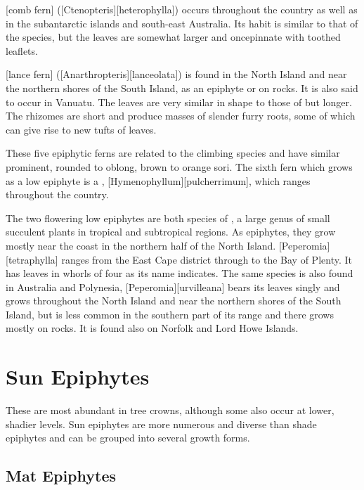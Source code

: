 [comb fern] ([Ctenopteris][heterophylla]) occurs throughout the country as well as in the subantarctic islands and south-east Australia.
Its habit is similar to that of the  species, but the leaves are somewhat larger and oncepinnate with toothed leaflets.

[lance fern] ([Anarthropteris][lanceolata]) is found in the North Island and near the northern shores of the South Island, as an epiphyte or on rocks.
It is also said to occur in Vanuatu.
The leaves are very similar in shape to those of  but longer.
The rhizomes are short and produce masses of slender furry roots, some of which can give rise to new tufts of leaves.

These five epiphytic ferns are related to the climbing  species and have similar prominent, rounded to oblong, brown to orange sori.
The sixth fern which grows as a low epiphyte is a , [Hymenophyllum][pulcherrimum], which ranges throughout the country.

The two flowering low epiphytes are both species of , a large genus of small succulent plants in tropical and subtropical regions.
As epiphytes, they grow mostly near the coast in the northern half of the North Island. [Peperomia][tetraphylla] ranges from the East Cape district through to the Bay of Plenty.
It has leaves in whorls of four as its name indicates.
The same species is also found in Australia and Polynesia, [Peperomia][urvilleana] bears its leaves singly and grows throughout the North Island and near the northern shores of the South Island, but is less common in the southern part of its range and there grows mostly on rocks.
It is found also on Norfolk and Lord Howe Islands.

\section{Sun Epiphytes}

These are most abundant in tree crowns, although some also occur at lower, shadier levels.
Sun epiphytes are more numerous and diverse than shade epiphytes and can be grouped into several growth forms.

\subsection{Mat Epiphytes}

